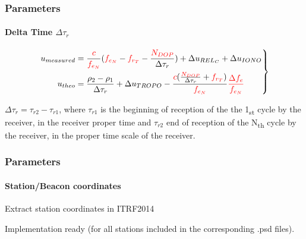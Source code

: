 \documentclass{beamer}
\begin{document}
\begin{frame}\frametitle{Parameters}\framesubtitle{Delta Time \(\Delta\tau_r\)}
  \begin{equation*}
    \left.\begin{aligned}
        u_{measured} & = \frac{\color{red}c}{\color{red}f_{e_N}} 
          (\textcolor{red}{f_{e_N}} - 
            \textcolor{red}{f_{r_T}} -
            \frac{\color{red}N_{DOP}}{\Delta\tau_r}) + 
          \Delta u_{{REL}_C} + 
          \Delta u_{IONO}\\
        u_{theo} &= \frac{\rho_2 - \rho_1}{\Delta\tau_r} + 
          \Delta u_{TROPO} - 
          \frac{\textcolor{red}c(\frac{\textcolor{red}{N_{DOP}}}{
            \Delta\tau_r
          } + 
          \textcolor{red}{f_{r_T}})}{\textcolor{red}{f_{e_N}}} 
          \textcolor{red}{\frac{\Delta f_e}{f_{e_N}}}
    \end{aligned}
\right\}
\end{equation*}

\(\Delta\tau_r = \tau_{r2} - \tau_{r1}\), where \(\tau_{r1}\) is the beginning of reception 
of the the 1\textsubscript{st} cycle by the receiver, in the receiver proper time and 
\(\tau_{r2}\) end of reception of the N\textsubscript{th} cycle by the receiver, in the 
proper time scale of the receiver.

\end{frame}

%    
%    
%

\begin{frame}\frametitle{Parameters}\framesubtitle{Station/Beacon coordinates}
    Extract station coordinates in ITRF2014\\
    \vspace{.3cm}

    Implementation ready (for all stations included in the corresponding .psd files).\\
    \vspace{.3cm}

\end{frame}
\end{document}
